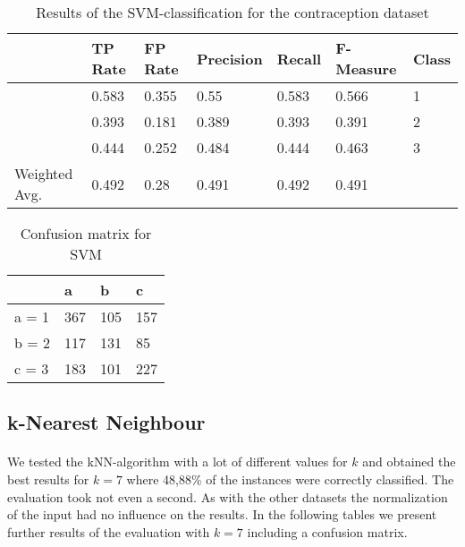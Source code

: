 \documentclass[paper=a4, fontsize=11pt]{scrartcl} %
\numberwithin{equation}{section} %
\numberwithin{figure}{section} %
\numberwithin{table}{section} %
\begin{document}
\begin{table}[htb]
\centering
\begin{tabular}{lllllll}
	\toprule
	&								TP Rate   	&FP Rate   &Precision   &Recall  &F-Measure     	&Class\\ 
	\midrule
									&0.583     	&0.355     &0.55      	&0.583   &0.566   		    	&1\\
                 	&0.393     	&0.181     &0.389     	&0.393   &0.391      	    	&2\\
                 	&0.444     	&0.252     &0.484     	&0.444   &0.463      	    	&3\\
	Weighted Avg.   &0.492     	&0.28      &0.491     	&0.492   &0.491     			&\\
	\bottomrule
\end{tabular}
\caption{Results of the SVM-classification for the contraception dataset}
\end{table}

\vspace{6pt}

\begin{table}[h]
\centering
\begin{tabular}{|l|lll|}
	\hline
	      &a   &b   &c \\
	\hline
	a = 1 &367 &105 &157 \\
 	b = 2 &117 &131 &85 \\
 	c = 3 &183 &101 &227 \\
  \hline
\end{tabular}
\caption{Confusion matrix for SVM}
\end{table}


\subsection{k-Nearest Neighbour}

\paragraph{}We tested the kNN-algorithm with a lot of different values for $k$ and obtained the best results for $k=7$ where 48,88\% of the instances were correctly classified. The evaluation took not even a second. As with the other datasets the normalization of the input had no influence on the results. In the following tables we present further results of the evaluation with $k=7$ including a confusion matrix.
\end{document}
